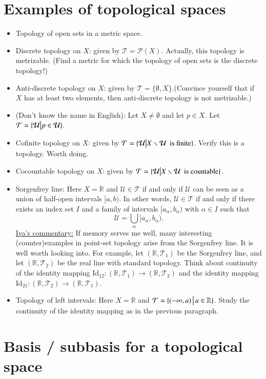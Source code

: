 \documentclass[11pt]{amsart}
\newcommand{\<}{\langle}
\renewcommand{\>}{\rangle}
\newcommand{\R}{\mathbb{R}}
\newcommand{\U}{\mathcal{U}}
\newcommand{\T}{\mathcal{T}}
\begin{document}
\section{Examples of topological spaces}
\begin{itemize}
\item Topology of open sets in a metric space. 
\medbreak
\item Discrete topology on $X$: given by $\T=\mathcal{P}(X)$. Actually, this topology is metrizable. (Find a metric for which the topology of open sets is the discrete topology!)
\medbreak
\item Anti-discrete topology on $X$: given by $\T=\{\emptyset, X\}$.(Convince yourself that if $X$ has at least two elements, then anti-discrete topology is not metrizable.)
\medbreak
\item (Don't know the name in English): Let $X\neq \emptyset$ and let $p\in X$. Let $\T=\{\U \big{|} p\in \U\}$.
\medbreak
\item Cofinite topology on $X$: given by $\T=\{\U \big{|} X\smallsetminus \U \text{\ \ is finite}\}$. Verify this is a topology. Worth doing. 
\medbreak
\item Cocountable topology on $X$: given by $\T=\{\U \big{|} X\smallsetminus \U \text{\ \ is countable}\}$.
\medbreak
\item Sorgenfrey line: Here $X=\R$ and $\U\in\T$ if and only if $\U$ can be seen as a union of half-open intervals $[a,b)$. In other words, $\U\in\T$ if and only if there exists an index set $I$ and a family of intervals $[a_\alpha, b_\alpha)$ with $\alpha \in I$ such that 
$$\U=\bigcup_\alpha [a_\alpha, b_\alpha).$$
\underline{Iva's commentary:} If memory serves me well, many interesting (counter)examples in point-set topology arise from the Sorgenfrey line. It is well worth looking into.  For example, let $(\R, \T_1)$ be the Sorgenfrey line, and let $(\R, \T_2)$ be the real line with standard topology. Think about continuity of the identity mapping $\mathrm{Id}_{12}:(\R,\T_1)\to (\R,\T_2)$ and the identity mapping $\mathrm{Id}_{21}:(\R,\T_2)\to (\R,\T_1)$.
\medbreak
\item Topology of left intervals: Here $X=\R$ and $\T=\{(-\infty,a)\,\big{|}\,a\in \R\}$. Study the continuity of the identity mapping as in the previous paragraph.
\end{itemize}

\section{Basis / subbasis for a topological space}
\end{document}
